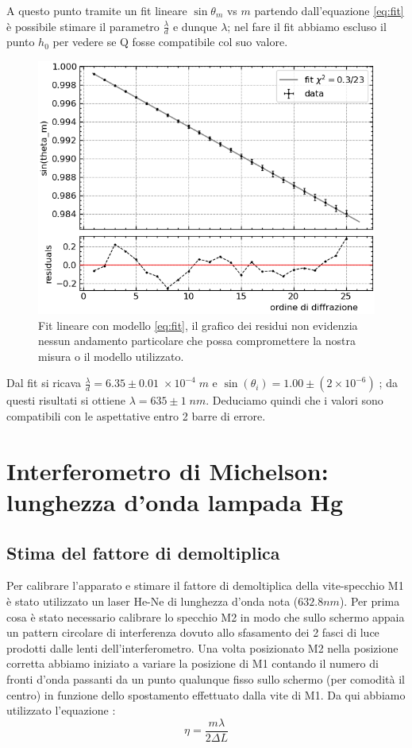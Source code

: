 \documentclass[10pt, a4paper, italian]{article}
\begin{document}
A questo punto tramite un fit lineare $\sin{\theta_m}$ vs $m$ partendo dall'equazione \ref{eq:fit} è possibile stimare il parametro $\frac{\lambda}{d}$ e dunque $\lambda$; nel fare il fit abbiamo escluso il punto $h_0$ per vedere se Q fosse compatibile col suo valore.
\begin{figure}
\includegraphics[width=\textwidth]{fit1}
\caption{\label{linfit1} Fit lineare con modello \ref{eq:fit}, il grafico dei residui non evidenzia nessun andamento particolare che possa compromettere la nostra misura o il modello utilizzato.}
\end{figure}
Dal fit si ricava $\frac{\lambda}{d}=6.35 \pm 0.01 \;\times 10^{-4} \; m$ e $\sin(\theta _i) =1.00 \pm (2 \times 10^{-6})\;$; da questi risultati si ottiene $\lambda=635 \pm 1 \;nm$.
Deduciamo quindi che i valori sono compatibili con le aspettative entro 2 barre di errore.
\section{Interferometro di Michelson: lunghezza d'onda lampada Hg}
\subsection{Stima del fattore di demoltiplica}
Per calibrare l'apparato e stimare il fattore di demoltiplica della vite-specchio M1 è stato utilizzato un laser He-Ne di lunghezza d'onda nota ($632.8 nm$).
Per prima cosa è stato necessario calibrare lo specchio M2 in modo che sullo schermo appaia un pattern circolare di interferenza dovuto allo sfasamento dei 2 fasci di luce prodotti dalle lenti dell'interferometro.
Una volta posizionato M2 nella posizione corretta abbiamo iniziato a variare la posizione di M1 contando il numero di fronti d'onda passanti da un punto qualunque fisso sullo schermo (per comodità il centro) in funzione dello spostamento effettuato dalla vite di M1. Da qui abbiamo utilizzato l'equazione :
\begin{equation}
\eta= \frac{m \lambda}{2 \Delta L}
\label{dem}
\end{equation}
\end{document}
